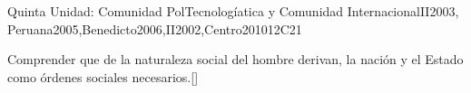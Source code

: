 \begin{syllabus}
\begin{unit}{}{Quinta Unidad: Comunidad PolTecnologíatica y Comunidad Internacional}{II2003, Peruana2005,Benedicto2006,II2002,Centro2010}{12}{C21}
\begin{topics}
\end{topics}
\begin{learningoutcomes}
	\item Comprender que de la naturaleza social del hombre derivan, la nación y el Estado como órdenes sociales necesarios.[\Familiarity]
\end{learningoutcomes}
\end{unit}



\begin{coursebibliography}
\end{coursebibliography}

\end{syllabus}
